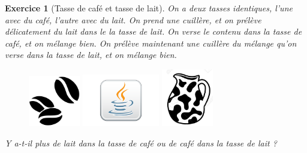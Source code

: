 \documentclass[12pt]{article}
\theoremstyle{break}
\newtheorem{exo}{Exercice}
\begin{document}
\begin{exo}[Tasse de café et tasse de lait]
On a deux tasses identiques, l'une avec du café, l'autre avec du lait. On prend une cuillère, et on prélève délicatement du lait dans le la tasse de lait. On verse le contenu dans la tasse de café, et on mélange bien. On prélève maintenant une cuillère du mélange qu'on verse dans la tasse de lait, et on mélange bien.

\begin{figure}[!ht]
	\centering
	\includegraphics[width=0.2\textwidth]{grainCafe.png}
    \includegraphics[width=0.3\textwidth]{LogoJava.png}
    \includegraphics[width=0.2\textwidth]{potAlait.jpg}
\end{figure}

Y a-t-il plus de lait dans la tasse de café ou de café dans la tasse de lait ?

\end{exo}
\end{document}

